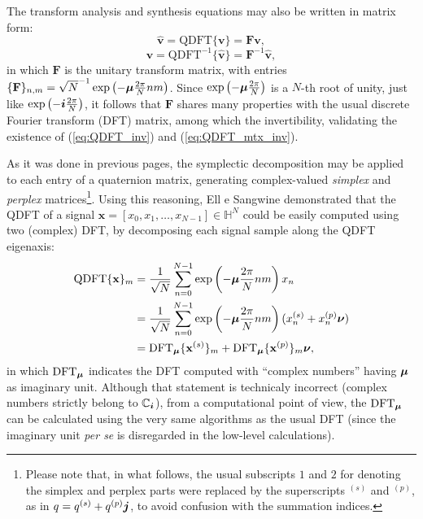 The transform analysis and synthesis equations may also be written in matrix form:
\begin{equation}
\label{eq:QDFT}
\widehat{\mathbf{v}} = \text{QDFT}\{ \mathbf{v} \} = \mathbf{F} \mathbf{v},
\end{equation}
\begin{equation}
\label{eq:QDFT_mtx_inv}
\mathbf{v} = \text{QDFT}^{-1}\{ \widehat{\mathbf{v}} \} = \mathbf{F}^{-1} \widehat{\mathbf{v}},
\end{equation}
in which $ \mathbf{F} $ is the unitary transform matrix,
with entries $ \{\mathbf{F}\}_{n,m} = \sqrt{N}^{-1} \exp \left( -\boldsymbol{\mu} \frac{2\pi}{N} nm \right)$. Since  $ \exp \left( -\boldsymbol{\mu} \frac{2\pi}{N} \right) $ is a $ N $-th root of unity, just like $ \exp \left( -\boldsymbol{i} \frac{2\pi}{N} \right) $, it follows that $ \mathbf{F} $ shares many properties with the usual discrete Fourier transform (DFT) matrix, among which the invertibility, validating the existence of (\ref{eq:QDFT_inv}) and (\ref{eq:QDFT_mtx_inv}).

As it was done in previous pages, the symplectic decomposition may be applied to each entry of a quaternion matrix, generating complex-valued \emph{simplex} and \emph{perplex} matrices\footnote{Please note that, in what follows, the usual subscripts $1$ and $2$ for denoting the simplex and perplex parts were replaced by the superscripts $^{(s)}$ and $^{(p)}$, as in $q = q^{(s)} + q^{(p)} \boldsymbol{j}$, to avoid confusion with the summation indices.}. Using this reasoning, Ell e Sangwine \cite{ell2014quaternion} demonstrated that the QDFT of a signal $ \mathbf{x} = [x_0, x_1, \dots, x_{N-1}] \in \mathbb{H}^N $ could be easily computed using two (complex) DFT, by decomposing each signal sample along the QDFT eigenaxis:
\begin{equation}
\begin{aligned}
\text{QDFT}\{ \mathbf{x} \}_m &= \frac{1}{\sqrt{N}} \sum_{n=0}^{N-1} \exp \left( -\boldsymbol{\mu} \frac{2\pi}{N} nm \right) x_n \\
&= \frac{1}{\sqrt{N}} \sum_{n=0}^{N-1} \exp \left( -\boldsymbol{\mu} \frac{2\pi}{N} nm \right) (x_n^{(s)} + x_n^{(p)}\boldsymbol{\nu}) \\
&= \text{DFT}_{\boldsymbol{\mu}}\{ \mathbf{x}^{(s)} \}_m +
\text{DFT}_{\boldsymbol{\mu}}\{ \mathbf{x}^{(p)} \}_m \boldsymbol{\nu},
\end{aligned}
\end{equation}
in which $ \text{DFT}_{\boldsymbol{\mu}} $ indicates the DFT computed with ``complex numbers'' having $ \boldsymbol{\mu} $ as imaginary unit.
Although that statement is technicaly incorrect (complex numbers strictly belong to $\mathbb{C}_{\boldsymbol{i}}$), from a computational point of view, the $ \text{DFT}_{\boldsymbol{\mu}} $ can be calculated using the very same algorithms as the usual DFT (since the imaginary unit \textit{per se} is disregarded in the low-level calculations).

